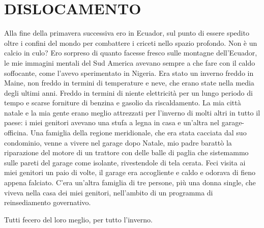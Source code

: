 \chapter{DISLOCAMENTO}\label{dislocamento}

\hfill\break

Alla fine della primavera successiva ero in Ecuador, sul punto di essere
spedito oltre i confini del mondo per combattere i criceti nello spazio
profondo. Non è un calcio in culo? Ero sorpreso di quanto facesse fresco
sulle montagne dell'Ecuador, le mie immagini mentali del Sud America
avevano sempre a che fare con il caldo soffocante, come l'avevo
sperimentato in Nigeria. Era stato un inverno freddo in Maine, non
freddo in termini di temperature e neve, che erano state nella media
degli ultimi anni. Freddo in termini di niente elettricità per un lungo
periodo di tempo e scarse forniture di benzina e gasolio da
riscaldamento. La mia città natale e la mia gente erano meglio
attrezzati per l'inverno di molti altri in tutto il paese: i miei
genitori avevano una stufa a legna in casa e un'altra nel
garage-officina. Una famiglia della regione meridionale, che era stata
cacciata dal suo condominio, venne a vivere nel garage dopo Natale, mio
padre barattò la riparazione del motore di un trattore con delle balle
di paglia che sistemammo sulle pareti del garage come isolante,
rivestendole di tela cerata. Feci visita ai miei genitori un paio di
volte, il garage era accogliente e caldo e odorava di fieno appena
falciato. C'era un'altra famiglia di tre persone, più una donna single,
che viveva nella casa dei miei genitori, nell'ambito di un programma di
reinsediamento governativo.

Tutti fecero del loro meglio, per tutto l'inverno.

